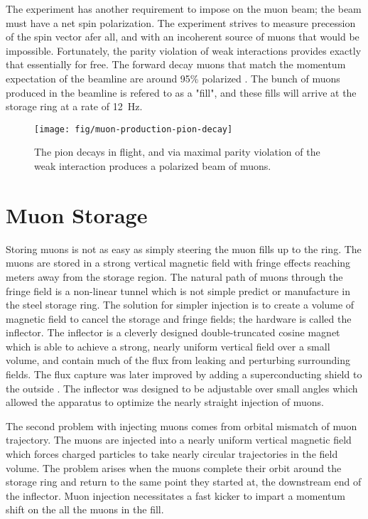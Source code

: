 The experiment has another requirement to impose on the muon beam; the beam must have a net spin polarization.  The experiment strives to measure precession of the spin vector afer all, and with an incoherent source of muons that would be impossible.  Fortunately, the parity violation of weak interactions provides exactly that essentially for free.  The forward decay muons that match the momentum expectation of the beamline are around 95\% polarized .  The bunch of muons produced in the beamline is refered to as a "fill", and these fills will arrive at the storage ring at a rate of \SI{12}{\Hz}.

\begin{figure}
\label{fig:muon-production-pion-decay}
\texttt{[image: fig/muon-production-pion-decay]}
\caption{The pion decays in flight, and via maximal parity violation of the weak interaction produces a polarized beam of muons. }
\end{figure}

\section{Muon Storage}

Storing muons is not as easy as simply steering the muon fills up to the ring.  The muons are stored in a strong vertical magnetic field with fringe effects reaching meters away from the storage region.  The natural path of muons through the fringe field is a non-linear tunnel which is not simple predict or manufacture in the steel storage ring.  The solution for simpler injection is to create a volume of magnetic field to cancel the storage and fringe fields; the hardware is called the inflector.  The inflector is a cleverly designed double-truncated cosine magnet which is able to achieve a strong, nearly uniform vertical field over a small volume, and contain much of the flux from leaking and perturbing surrounding fields.  The flux capture was later improved by adding a superconducting shield to the outside .  The inflector was designed to be adjustable over small angles which allowed the apparatus to optimize the nearly straight injection of muons.


The second problem with injecting muons comes from orbital mismatch of muon trajectory.  The muons are injected into a nearly uniform vertical magnetic field which forces charged particles to take nearly circular trajectories in the field volume.  The problem arises when the muons complete their orbit around the storage ring and return to the same point they started at, the downstream end of the inflector.  Muon injection necessitates a fast kicker to impart a momentum shift on the all the muons in the fill.  


